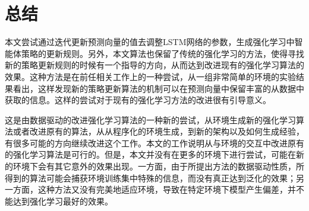 \chapter{总结}
\label{cha:experiment}

本文尝试通过迭代更新预测向量的值去调整LSTM网络的参数，生成强化学习中智能体策略的更新规则。另外，本文算法也保留了传统的强化学习的方法，使得寻找新的策略更新规则的时候有一个指导的方向，从而达到改进现有的强化学习算法的效果。这种方法是在前任相关工作上的一种尝试，从一组非常简单的环境的实验结果看出，这样发现新的策略更新算法的机制可以在预测向量中保留丰富的从数据中获取的信息。这样的尝试对于现有的强化学习方法的改进很有引导意义。

这是由数据驱动的改进强化学习算法的一种新的尝试，从环境生成新的强化学习算法或者改进原有的算法，从从程序化的环境生成，到新的架构以及如何生成经验，有很多可能的方向继续改进这个工作。本文的工作说明从与环境的交互中改进原有的强化学习算法是可行的。但是，本文并没有在更多的环境下进行尝试，可能在新的环境下会有其它意外的效果出现。一方面，由于所提出方法的数据驱动性质，所得到的算法可能会捕获环境训练集中特殊的信息，而没有真正达到泛化的效果；另一方面，这种方法又没有完美地适应环境，导致在特定环境下模型产生偏差，并不能达到强化学习最好的效果。